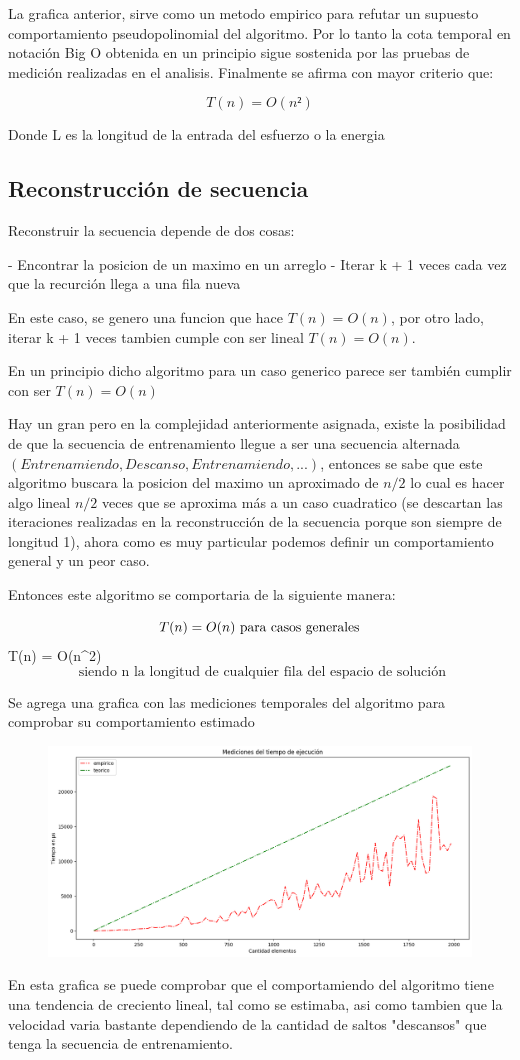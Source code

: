 La grafica anterior, sirve como un metodo empirico para refutar un supuesto comportamiento pseudopolinomial del algoritmo. Por lo tanto la cota temporal en notación Big O obtenida en un principio sigue sostenida por las pruebas de medición realizadas en el analisis. Finalmente se afirma con mayor criterio que:

$$
 T(n) = O(n²)
$$

Donde L es la longitud de la entrada del esfuerzo o la energia 

\subsection{Reconstrucción de secuencia}
Reconstruir la secuencia depende de dos cosas: 

- Encontrar la posicion de un maximo en un arreglo
- Iterar k + 1 veces cada vez que la recurción llega a una fila nueva 

En este caso, se genero una funcion que hace  $T(n) = O(n)$, por otro lado, iterar k + 1 veces tambien cumple con ser lineal $T(n) = O(n)$.

En un principio dicho algoritmo para un caso generico parece ser también cumplir con ser $T(n) = O(n)$

Hay un gran pero en la complejidad anteriormente asignada, existe la posibilidad de que la secuencia de entrenamiento llegue a ser una secuencia alternada $(Entrenamiendo, Descanso, Entrenamiendo, ...)$, entonces se sabe que este algoritmo buscara la posicion del maximo un aproximado de $n/2$ lo cual es hacer algo lineal $n/2$ veces que se aproxima más a un caso cuadratico (se descartan las iteraciones realizadas en la reconstrucción de la secuencia porque son siempre de longitud 1), ahora como es muy particular podemos definir un comportamiento general y un peor caso. 

Entonces este algoritmo se comportaria de la siguiente manera:

$$
T(n) = O(n) \text{ para casos generales} \\
$$
T(n) = O(n^2)  \\
$$
 \text{ siendo n la longitud de cualquier fila del espacio de solución}
$$

Se agrega una grafica con las mediciones temporales del algoritmo para comprobar su comportamiento estimado

\begin{figure}[H]
    \centering
    \includegraphics[width=1\textwidth]{graficos/reconstruccion.png}
\end{figure}

En esta grafica se puede comprobar que el comportamiendo del algoritmo tiene una tendencia de creciento lineal, tal como se estimaba, asi como tambien que la velocidad varia bastante dependiendo de la cantidad de saltos "descansos" que tenga la secuencia de entrenamiento. 